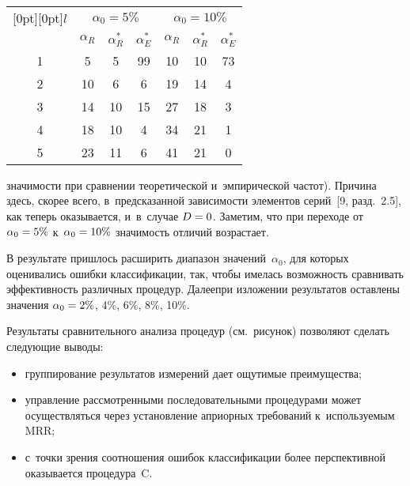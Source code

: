\begin{multicols}{2}
{\begin{center}
{\small
\tabcolsep=10.5pt
\begin{tabular}{|c|c|c|c|c|c|c|}
\hline
\multicolumn{1}{|c|}{\raisebox{-6pt}[0pt][0pt]{$l$}}&\multicolumn{3}{c|}{$\alpha_0 =5\%$}&\multicolumn{3}{c|}{$\alpha_0 =10\%$}\\
\cline{2-7}
&$\alpha_R$&$\alpha_R^*$&$\alpha_E^*$&$\alpha_R$&$\alpha_R^*$&$\alpha_E^*$\\
\hline
1&\hphantom{9}5&\hphantom{9}5&99&10&10&73\hphantom{9}\\
2&10&\hphantom{9}6&\hphantom{9}6&19&14&4\\
3&14&10&15&27&18&3\\
4&18&10&\hphantom{9}4&34&21&1\\
5&23&11&\hphantom{9}6&41&21&0\\
\hline
\end{tabular}}
\end{center}
}


\vspace*{12pt}

\noindent
 значимости при сравнении теоретической 
и~эмпирической частот). Причина здесь, скорее всего, в~предсказанной 
зависимости элементов серий~[9, разд.~2.5], как теперь оказывается, 
и~в~случае $D\hm=0$. Заметим, что при переходе от $\alpha_0\hm=5\%$ 
к~$\alpha_0\hm=10\%$ значимость отличий возрастает.

В результате пришлось расширить диапазон значений~$\alpha_0$, для 
которых оценивались ошибки классификации, так, чтобы имелась возможность 
сравнивать эффективность различных процедур. Далее\linebreak при изложении 
результатов оставлены значения $\alpha_0\hm=2\%$, 4\%, 6\%,  
8\%, 10\%.
      


 Результаты сравнительного анализа процедур (см.\ рисунок) позволяют 
сделать следующие выводы:
     \begin{itemize}
\item группирование результатов измерений дает ощутимые 
преимущества;
\item управление рассмотренными последовательными процедурами 
может осуществляться через установление априорных требований 
к~используемым MRR;
\item с~точки зрения соотношения ошибок классификации более 
перспективной оказывается процедура~C.
\end{itemize}


\end{multicols}
